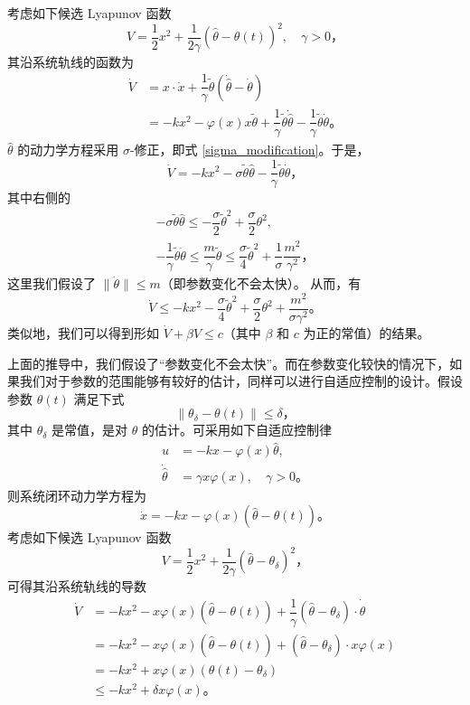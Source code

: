 考虑如下候选 Lyapunov 函数
\[
    V = \dfrac{1}{2} x^2 + \dfrac{1}{2 \gamma} {\left( \hat{\theta} - \theta(t) \right)}^2, \quad \gamma > 0 \text{，}
\]
其沿系统轨线的函数为
\begin{align*}
    \dot{V} &= x \cdot \dot{x} + \dfrac{1}{\gamma} \tilde{\theta} \left( \dot{\hat{\theta}} - \dot{\theta} \right) \\
    &= -k x^2 - \varphi(x) x \tilde{\theta} + \dfrac{1}{\gamma} \tilde{\theta} \dot{\hat{\theta}} - \dfrac{1}{\gamma} \tilde{\theta} \dot{\theta} \text{。}
\end{align*}
$\hat{\theta}$ 的动力学方程采用 $\sigma$-修正，即式 \eqref{sigma_modification}。于是，
\[
    \dot{V} = -k x^2 - \sigma \tilde{\theta} \hat{\theta} - \dfrac{1}{\gamma} \tilde{\theta} \dot{\theta} \text{，}
\]
其中右侧的
\begin{gather*}
    -\sigma \tilde{\theta} \hat{\theta} \leq -\dfrac{\sigma}{2} {\tilde{\theta}}^2 + \dfrac{\sigma}{2} {\theta}^2, \\
    -\dfrac{1}{\gamma} \tilde{\theta} \dot{\theta} \leq \dfrac{m}{\gamma} \tilde{\theta} \leq \dfrac{\sigma}{4} \tilde{\theta}^2 + \dfrac{1}{\sigma} \dfrac{m^2}{\gamma^2} \text{，}
\end{gather*}
这里我们假设了 $\| \dot{\theta} \| \leq m$（即参数变化不会太快）。
从而，有
\[
    \dot{V} \leq -k x^2 - \dfrac{\sigma}{4} {\tilde{\theta}}^2 + \dfrac{\sigma}{2} \theta^2 + \dfrac{m^2}{\sigma \gamma^2} \text{。}
\]
类似地，我们可以得到形如 $\dot{V} + \beta{V} \leq c$（其中 $\beta$ 和 $c$ 为正的常值）的结果。

上面的推导中，我们假设了“参数变化不会太快”。而在参数变化较快的情况下，如果我们对于参数的范围能够有较好的估计，同样可以进行自适应控制的设计。假设参数 $\theta(t)$ 满足下式
\[
    \| \theta_\delta - \theta(t) \| \leq \delta \text{，}
\]
其中 $\theta_\delta$ 是常值，是对 $\theta$ 的估计。可采用如下自适应控制律
\begin{align*}
    u &= -k x - \varphi(x) \hat{\theta}, \\
    \dot{\hat{\theta}} &= \gamma x \varphi(x), \quad \gamma > 0 \text{。}
\end{align*}
则系统闭环动力学方程为
\[
    \dot{x} = -k x - \varphi(x) \left( \hat{\theta} - \theta(t) \right) \text{。}
\]
考虑如下候选 Lyapunov 函数
\[
    V = \dfrac{1}{2} x^2 + \frac{1}{2 \gamma} {\left( \hat{\theta} - \theta_\delta \right)}^2 \text{，}
\]
可得其沿系统轨线的导数
\begin{align*}
    \dot{V} &= -k x^2 - x \varphi(x) \left( \hat{\theta} - \theta(t) \right) + \dfrac{1}{\gamma} \left( \hat{\theta} - \theta_\delta \right) \cdot \dot{\hat{\theta}} \\
    &= -k x^2 - x \varphi(x) \left( \hat{\theta} - \theta(t) \right) +  \left( \hat{\theta} - \theta_\delta \right) \cdot x \varphi(x) \\
    &= -k x^2 + x \varphi(x) \left( \theta(t) - \theta_\delta \right) \\
    &\leq -k x^2 + \delta x \varphi(x) \text{。}
\end{align*}
